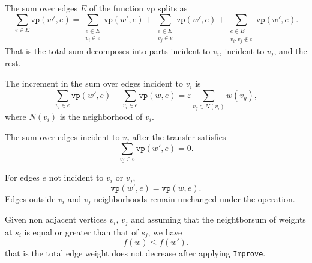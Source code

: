 \begin{lemma}
    \label{lem:Improve_partition_sum_split}
The sum over edges \(E\) of the function \(\texttt{vp}\) splits as
\[
\sum_{e \in E} \texttt{vp}(w', e) = \sum_{\substack{e \in E \\ v_i \in e}} \texttt{vp}(w', e) + \sum_{\substack{e \in E \\ v_j \in e}} \texttt{vp}(w', e) + \sum_{\substack{e \in E \\ v_i, v_j \notin e}} \texttt{vp}(w', e).
\]
That is the total sum decomposes into parts incident to \(v_i\), incident to \(v_j\), and the rest.
\end{lemma}

\begin{lemma}
    \label{lem:Improve_gain_contribution_increase}
The increment in the sum over edges incident to \(v_i\) is
\[
\sum_{v_i \in e} \texttt{vp}(w', e) - \sum_{v_i \in e} \texttt{vp}(w, e) = \varepsilon \sum_{v_y \in N(v_i)} w(v_y),
\]
where \(N(v_i)\) is the neighborhood of \(v_i\).
\end{lemma}

\begin{lemma}
    \label{lem:Improve_loose_contribution_zero}
The sum over edges incident to \(v_j\) after the transfer satisfies
\[
\sum_{v_j \in e} \texttt{vp}(w', e) = 0.
\]
\end{lemma}

\begin{lemma}
    \label{lem:Improve_unchanged_edge_sum}
For edges \(e\) not incident to \(v_i\) or \(v_j\),
\[
\texttt{vp}(w', e) = \texttt{vp}(w, e).
\]
Edges outside \(v_i\) and \(v_j\) neighborhoods remain unchanged under the operation.
\end{lemma}

\begin{lemma}
    \label{lem:Improve_total_weight_nondec}
Given non adjacent vertices \(v_i\), \(v_j\) and assuming that the neightborsum of weights at \(s_i\) is equal or greater than that of \(s_j\), we have
\[
f(w) \leq f(w').
\]
that is the total edge weight does not decrease after applying \texttt{Improve}.
\end{lemma}

